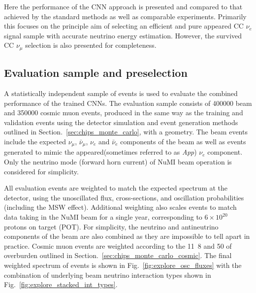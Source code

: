 Here the performance of the CNN approach is presented and compared to that achieved by the
standard \chips methods as well as comparable experiments. Primarily this focuses on the principle
aim of selecting an efficient and pure appeared CC $\nu_{e}$ signal sample with accurate neutrino
energy estimation. However, the survived CC $\nu_{\mu}$ selection is also presented for
completeness.

\subsection{Evaluation sample and preselection} %
\label{sec:results_eval_sample} %

A statistically independent sample of events is used to evaluate the combined performance of the
trained CNNs. The evaluation sample consists of 400000 beam and 350000 cosmic muon events,
produced in the same way as the training and validation events using the detector simulation and
event generation methods outlined in Section.~\ref{sec:chips_monte_carlo}, with a \chipsfive
geometry. The beam events include the expected $\nu_{\mu}$, $\bar{\nu}_{\mu}$, $\nu_{e}$ and
$\bar{\nu}_{e}$ components of the beam as well as events generated to mimic the appeared(sometimes
referred to as \emph{App}) $\nu_{e}$ component. Only the neutrino mode (forward horn current) of
NuMI beam operation is considered for simplicity.

All evaluation events are weighted to match the expected spectrum at the \chipsfive detector,
using the unoscillated flux, cross-sections, and oscillation probabilities (including the MSW
effect). Additional weighting also scales events to match data taking in the NuMI beam for a
single year, corresponding to $6\times 10^{20}$ protons on target (POT). For simplicity, the
neutrino and antineutrino components of the beam are also combined as they are impossible to tell
apart in practice. Cosmic muon events are weighted according to the \unit{11.8}{} and
\unit{50}{} of overburden outlined in Section.~\ref{sec:chips_monte_carlo_cosmic}. The
final weighted spectrum of events is shown in Fig.~\ref{fig:explore_osc_fluxes} with the
combination of underlying beam neutrino interaction types shown in
Fig.~\ref{fig:explore_stacked_int_types}.

